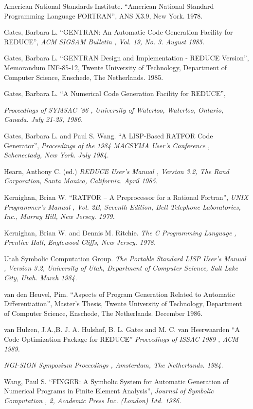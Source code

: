 American National Standards Institute.  ``American National
Standard Programming Language FORTRAN'', ANS X3.9, New York.  1978.

Gates, Barbara L.  ``GENTRAN:  An Automatic Code Generation Facility for
REDUCE'', 
\it ACM SIGSAM Bulletin
\rm , Vol. 19, No. 3.  August 1985.

Gates, Barbara L.  ``GENTRAN Design and Implementation - REDUCE
Version'', Memorandum INF-85-12, Twente University of Technology,
Department of Computer Science, Enschede, The Netherlands.  1985.

Gates, Barbara L.  ``A Numerical Code Generation Facility for REDUCE'',

\it Proceedings of SYMSAC '86
\rm , University of Waterloo, Waterloo, Ontario,
Canada.  July 21-23, 1986.

Gates, Barbara L. and Paul S. Wang.  ``A LISP-Based RATFOR Code
Generator'', 
\it Proceedings of the 1984 MACSYMA User's Conference
\rm ,
Schenectady, New York.  July 1984.

Hearn, Anthony C. (ed.)  
\it REDUCE User's Manual
\rm , Version 3.2,
The Rand Corporation, Santa Monica, California.  April 1985.

Kernighan, Brian W.  ``RATFOR -- A Preprocessor for a Rational
Fortran'', 
\it UNIX Programmer's Manual
\rm , Vol. 2B, Seventh
Edition, Bell Telephone Laboratories, Inc., Murray Hill,
New Jersey.  1979.

Kernighan, Brian W. and Dennis M. Ritchie.  
\it The C Programming Language
\rm ,
Prentice-Hall, Englewood Cliffs, New Jersey.  1978.

Utah Symbolic Computation Group.  
\it The Portable Standard LISP User's
Manual
\rm , Version 3.2, University of Utah, Department of Computer
Science, Salt Lake City, Utah.  March 1984.

van den Heuvel, Pim.  ``Aspects of Program Generation Related to Automatic
Differentiation'', Master's Thesis, Twente University of Technology,
Department of Computer Science, Enschede, The Netherlands.  December 1986.

van Hulzen, J.A.,B. J. A. Hulshof, B. L. Gates and M. C. van Heerwaarden
``A Code Optimization Package for REDUCE''
\it Proceedings of ISSAC 1989 \rm , ACM 1989.

\it NGI-SION Symposium Proceedings
\rm , Amsterdam, The Netherlands.  1984.

Wang, Paul S.  ``FINGER:  A Symbolic System for Automatic Generation of
Numerical Programs in Finite Element Analysis'', 
\it Journal of Symbolic
Computation
\rm , 2, Academic Press Inc. (London) Ltd.  1986.


